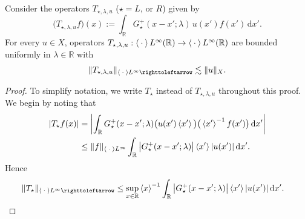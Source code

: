 \documentclass[../dissertation]{subfiles}
\begin{document}
\begin{prop}\label{prop2:Tbnd}
	Consider the operators $T_{\star,\lambda, u}$ 
	($\star = L \text{, or }R$)
	given by
	\[
		\big(T_{\star,\lambda, u} f\big)(x) 
			:= \int_{\mathbb R} G_\star^+(x-x'; \lambda) \, u(x') f(x') \, \mathrm{d}x'.
	\]
	For every $u \in X$, operators \label{sym:mapsto}
	$T_{\star, \lambda, u}: \left\langle \kern 0.5ex \cdot \kern 0.5ex \right\rangle L^\infty(\mathbb R) 
	\to \left\langle \kern 0.5ex \cdot \kern 0.5ex \right\rangle L^\infty(\mathbb R)$ are bounded uniformly in $\lambda\in\mathbb R$ with
	\begin{align}\label{eq3:Tbndxbrac}
		\|T_{\star, \lambda, u}\|_{\inn{\dotarg} L^\infty \toitself} 
			\lesssim \|u\|_X.
	\end{align}
\end{prop}
\begin{proof}
	To simplify notation, we write $T_\star$ instead of $T_{\star, \lambda, u}$
	throughout this proof. We begin by noting that
	\begin{align*}
		|T_\star f(x)| 
			&= 
				\left| 
					\int_{\mathbb R} 
						G_\star^+(x-x'; \lambda) \big(u(x')\left\langle x' \right\rangle\big)
						\big(\left\langle x' \right\rangle^{-1} f(x')\big)
					\, \mathrm{d}x'
				\right| \\
			&\leq 
				\|f\|_{\left\langle \kern 0.5ex \cdot \kern 0.5ex \right\rangle L^\infty} 
				\int_{\mathbb R}
					\big|G_\star^+(x-x'; \lambda)\big|
					\left\langle x' \right\rangle |u(x')|
				\, \mathrm{d}x'.
	\end{align*}
	Hence
	\begin{align}
		\|T_\star\|_{\inn{\dotarg} L^\infty \toitself} 
			&\leq \sup_{x\in \mathbb R} \inn{x}^{-1}
				\int_{\mathbb R}
					\big|G_\star^+(x-x'; \lambda)\big|
					\inn{x'} |u(x')|
				\, \mathrm{d}x'.
	\end{align}
	

\end{proof}
\end{document}
